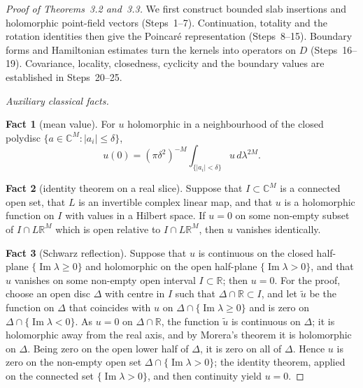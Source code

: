 \documentclass[11pt]{amsart}
\theoremstyle{definition}
\begin{document}
\begin{proof}[Proof of Theorems~3.2 and~3.3]
We first construct bounded slab insertions and holomorphic point-field
vectors (Steps~1--7). Continuation, totality and the rotation identities
then give the Poincar\'e representation (Steps~8--15). Boundary forms
and Hamiltonian estimates turn the kernels into operators on $D$
(Steps~16--19). Covariance, locality, closedness, cyclicity and the
boundary values are established in Steps~20--25.

\emph{Auxiliary classical facts.}

\textbf{Fact 1} (mean value).
For $u$ holomorphic in a neighbourhood of the closed polydisc $\{a\in\mathbb C^M:|a_i|\le\delta\}$,
\begin{equation*}
u(0)=(\pi\delta^2)^{-M}\int_{\{|a_i|<\delta\}}u\,d\lambda^{2M}.
\end{equation*}

\textbf{Fact 2} (identity theorem on a real slice).
Suppose that $I\subset\mathbb C^M$ is a connected open set, that $L$ is an invertible complex linear map, and that $u$ is a holomorphic function on $I$ with values in a Hilbert space.
If $u=0$ on some non-empty subset of $I\cap L\mathbb R^M$ which is open relative to $I\cap L\mathbb R^M$, then $u$ vanishes identically.

\textbf{Fact 3} (Schwarz reflection).
Suppose that $u$ is continuous on the closed half-plane $\{\operatorname{Im}\lambda\ge0\}$ and holomorphic on the open half-plane $\{\operatorname{Im}\lambda>0\}$, and that $u$ vanishes on some non-empty open interval $I\subset\mathbb R$; then $u=0$.
For the proof, choose an open disc $\Delta$ with centre in $I$ such that $\Delta\cap\mathbb R\subset I$, and let $\tilde u$ be the function on $\Delta$ that coincides with $u$ on $\Delta\cap\{\operatorname{Im}\lambda\ge0\}$ and is zero on $\Delta\cap\{\operatorname{Im}\lambda<0\}$.
As $u=0$ on $\Delta\cap\mathbb R$, the function $\tilde u$ is continuous on $\Delta$; it is holomorphic away from the real axis, and by Morera's theorem it is holomorphic on $\Delta$.
Being zero on the open lower half of $\Delta$, it is zero on all of $\Delta$.
Hence $u$ is zero on the non-empty open set $\Delta\cap\{\operatorname{Im}\lambda>0\}$; the identity theorem, applied on the connected set $\{\operatorname{Im}\lambda>0\}$, and then continuity yield $u=0$.


\end{proof}
\end{document}
